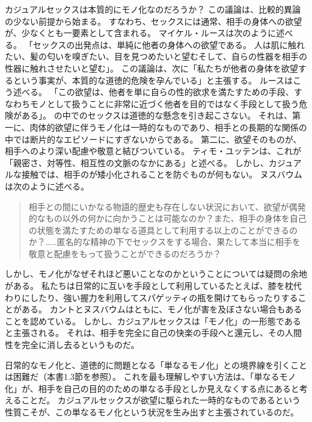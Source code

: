 \documentclass[paper=a4,book,openany]{jlreq} \usepackage{mystyle}
\begin{document}
カジュアルセックスは本質的にモノ化なのだろうか？ この議論は、比較的異論の少ない前提から始まる。
すなわち、セックスには通常、相手の身体への欲望が、少なくとも一要素として含まれる。
マイケル・ルースは次のように述べる。
「セックスの出発点は、単純に他者の身体への欲望である。
人は肌に触れたい、髪の匂いを嗅ぎたい、目を見つめたいと望む{\DDASH}そして、自らの性器を相手の性器に触れさせたいと望む」。
この議論は、次に「私たちが他者の身体を欲望するという事実が、本質的な道徳的危険を孕んでいる」と主張する。
ルースはこう述べる。
「この欲望は、他者を単に自らの性的欲求を満たすための手段、すなわちモノとして扱うことに非常に近づく{\DDASH}他者を目的ではなく手段として扱う危険がある」\citep[p. 185]{ruse88:_homos}。
の中でのセックスは道徳的な懸念を引き起こさない。
それは、第一に、肉体的欲望に伴うモノ化は一時的なものであり、相手との長期的な関係の中では断片的なエピソードにすぎないからである。
第二に、欲望そのものが、相手へのより深い配慮や敬意と結びついている。
ティモ・ユッテンは、これが「親密さ、対等性、相互性の文脈のなかにある」と述べる\citep[p. 31]{jutten16:_sexual_objec}。
しかし、カジュアルな接触では、相手のが矮小化されることを防ぐものが何もない。
ヌスバウムは次のように述べる。

\begin{quote}
  相手との間にいかなる物語的歴史も存在しない状況において、欲望が偶発的なもの以外の何かに向かうことは可能なのか？また、相手の身体を自己の状態を満たすための単なる道具として利用する以上のことができるのか？……匿名的な精神の下でセックスをする場合、果たして本当に相手を敬意と配慮をもって扱うことができるのだろうか？\citep[p. 287]{nussbaum95:_objec}
\end{quote}

しかし、モノ化がなぜそれほど悪いことなのかということについては疑問の余地がある。
私たちは日常的に互いを手段として利用している{\DDASH}たとえば、膝を枕代わりにしたり、強い握力を利用してスパゲッティの瓶を開けてもらったりすることがある。
カントとヌスバウムはともに、モノ化が害を及ぼさない場合もあることを認めている。
しかし、カジュアルセックスは「モノ化」の一形態であると主張される。
それは、相手を完全に自己の快楽の手段へと還元し、その人間性を完全に消し去るというものだ。

日常的なモノ化と、道徳的に問題となる「単なるモノ化」との境界線を引くことは困難だ（本書1.3節を参照）。
これを最も理解しやすい方法は、「単なるモノ化」が、相手を自己の目的のための単なる手段としか見えなくする点にあると考えることだ。
カジュアルセックスが欲望に駆られた一時的なものであるという性質こそが、この単なるモノ化という状況を生み出すと主張されているのだ。
\end{document}
